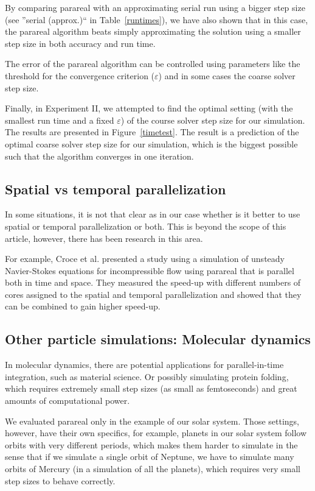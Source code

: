 \documentclass[conference]{IEEEtran}
\begin{document}
By comparing parareal with an approximating serial run using a bigger step size (see ''serial (approx.)`` in Table~\ref{runtimes}), we have also shown that in this case, the parareal algorithm beats simply approximating the solution using a smaller step size in both accuracy and run time. 

The error of the parareal algorithm can be controlled using parameters like the threshold for the convergence criterion ($\varepsilon$) and in some cases the coarse solver step size.

Finally, in Experiment II, we attempted to find the optimal setting (with the smallest run time and a fixed $\varepsilon$) of the course solver step size for our simulation. The results are presented in Figure~\ref{timetest}. The result is a prediction of the optimal coarse solver step size for our simulation, which is the biggest possible such that the algorithm converges in one iteration.

\subsection{Spatial vs temporal parallelization}

In some situations, it is not that clear as in our case whether is it better to use spatial or temporal parallelization or both. This is beyond the scope of this article, however, there has been research in this area.

For example, Croce et al. presented a study using a simulation of unsteady Navier-Stokes equations for incompressible flow using parareal that is parallel both in time and space. They measured the speed-up with different numbers of cores assigned to the spatial and temporal parallelization and showed that they can be combined to gain higher speed-up. \cite{spacetime}

\subsection{Other particle simulations: Molecular dynamics}
In molecular dynamics, there are potential applications for parallel-in-time integration, such as material science. \cite{moldyn} Or possibly simulating protein folding, which requires extremely small step sizes (as small as femtoseconds) and great amounts of computational power. \cite{protein}

We evaluated parareal only in the example of our solar system. Those settings, however, have their own specifics, for example, planets in our solar system follow orbits with very different periods, which makes them harder to simulate in the sense that if we simulate a single orbit of Neptune, we have to simulate many orbits of Mercury (in a simulation of all the planets), which requires very small step sizes to behave correctly. 
\end{document}
